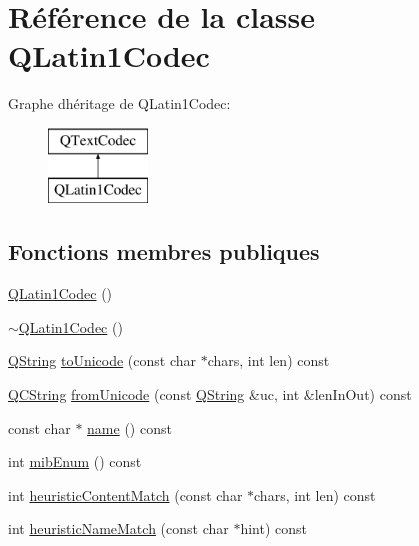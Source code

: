\hypertarget{class_q_latin1_codec}{}\section{Référence de la classe Q\+Latin1\+Codec}
\label{class_q_latin1_codec}
Graphe d\textquotesingle{}héritage de Q\+Latin1\+Codec\+:\begin{figure}[H]
\begin{center}
\leavevmode
\includegraphics[height=2.000000cm]{class_q_latin1_codec}
\end{center}
\end{figure}
\subsection*{Fonctions membres publiques}
\begin{DoxyCompactItemize}
\item 
\hyperlink{class_q_latin1_codec_af8264fae07158c651afa34de72ca19d9}{Q\+Latin1\+Codec} ()
\item 
\hyperlink{class_q_latin1_codec_a2c3f42fb1d373f712b86a74619334321}{$\sim$\+Q\+Latin1\+Codec} ()
\item 
\hyperlink{class_q_string}{Q\+String} \hyperlink{class_q_latin1_codec_a0d093c74dac20a8c1b4c82fe80da0525}{to\+Unicode} (const char $\ast$chars, int len) const 
\item 
\hyperlink{class_q_c_string}{Q\+C\+String} \hyperlink{class_q_latin1_codec_ab277178e5b7d68e0e1631be5291f35df}{from\+Unicode} (const \hyperlink{class_q_string}{Q\+String} \&uc, int \&len\+In\+Out) const 
\item 
const char $\ast$ \hyperlink{class_q_latin1_codec_af900d4dc043121c9a4a03743599aada6}{name} () const 
\item 
int \hyperlink{class_q_latin1_codec_ae829a64f34d43950d5f21dd563e9fa12}{mib\+Enum} () const 
\item 
int \hyperlink{class_q_latin1_codec_a090765f95f4f82added38457120c0253}{heuristic\+Content\+Match} (const char $\ast$chars, int len) const 
\item 
int \hyperlink{class_q_latin1_codec_abc865957a2bb741f164a52df16797d02}{heuristic\+Name\+Match} (const char $\ast$hint) const 
\end{DoxyCompactItemize}
